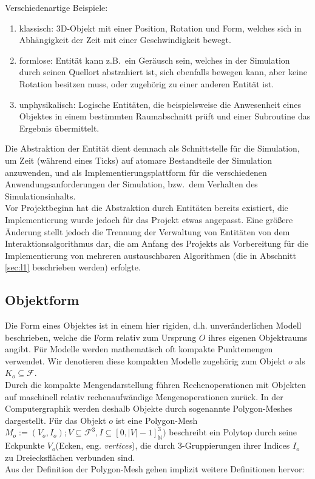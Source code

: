 Verschiedenartige Beispiele:
\begin{enumerate}
\item klassisch: 3D-Objekt mit einer Position, Rotation und Form, welches sich in Abhängigkeit der Zeit mit einer Geschwindigkeit bewegt.\\
\item formlose: Entität kann z.B.~ein Geräusch sein, welches in der Simulation durch seinen Quellort abstrahiert ist, sich ebenfalls bewegen kann, aber keine Rotation besitzen muss, oder zugehörig zu einer anderen Entität ist.
\item unphysikalisch: Logische Entitäten, die beispielsweise die Anwesenheit eines Objektes in einem bestimmten Raumabschnitt prüft und einer Subroutine das Ergebnis übermittelt.
\end{enumerate}
Die Abstraktion der Entität dient demnach als Schnittstelle für die Simulation, um Zeit (während eines Ticks) auf atomare Bestandteile der Simulation anzuwenden, und als Implementierungsplattform für die verschiedenen Anwendungsanforderungen der Simulation, bzw.~dem Verhalten des Simulationsinhalts.\\

Vor Projektbeginn hat die Abstraktion durch Entitäten bereits existiert, die Implementierung wurde jedoch für das Projekt etwas angepasst. Eine größere Änderung stellt jedoch die Trennung der Verwaltung von Entitäten von dem Interaktionsalgorithmus dar, die am Anfang des Projekts als Vorbereitung für die Implementierung von mehreren austauschbaren Algorithmen (die in Abschnitt \ref{sec:l1} beschrieben werden) erfolgte.

\subsection{Objektform}
\label{object_form}
Die Form eines Objektes ist in einem hier rigiden, d.h. unveränderlichen Modell beschrieben, welche die Form relativ zum Ursprung $O$ ihres eigenen Objektraums angibt.
Für Modelle werden mathematisch oft kompakte Punktemengen verwendet. Wir denotieren diese kompakten Modelle zugehörig zum Objekt $o$ als $ K_o \subseteq \mathcal{F}$.\\

Durch die kompakte Mengendarstellung führen Rechenoperationen mit Objekten auf maschinell relativ rechenaufwändige Mengenoperationen zurück. In der Computergraphik werden deshalb Objekte durch sogenannte Polygon-Meshes dargestellt. 
Für das Objekt $o$ ist eine Polygon-Mesh $M_o := (V_o, I_o); V \subseteq \mathcal{F}^3, I \subseteq [0, |V|-1]_\mathbb{N}^3 )$ beschreibt ein Polytop durch seine Eckpunkte $V_o$(Ecken, eng. \textit{vertices}), die durch 3-Gruppierungen ihrer Indices $I_o$ zu Dreiecksflächen verbunden sind.\\
Aus der Definition der Polygon-Mesh gehen implizit weitere Definitionen hervor:

